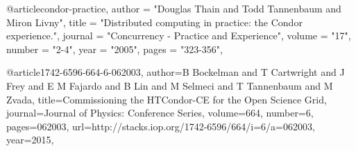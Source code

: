 



@article{condor-practice, 
  author    = "Douglas Thain and Todd Tannenbaum and Miron Livny",
  title     = "Distributed computing in practice: the Condor experience.",
  journal   = "Concurrency - Practice and Experience",
  volume    = "17",
  number    = "2-4",
  year      = "2005",
  pages     = "323-356",
}


@article{1742-6596-664-6-062003,
    author={B Bockelman and T Cartwright and J Frey and E M Fajardo and B Lin and M Selmeci and T Tannenbaum and M Zvada},
    title={Commissioning the HTCondor-CE for the Open Science Grid},
    journal={Journal of Physics: Conference Series},
    volume={664},
    number={6},
    pages={062003},
    url={http://stacks.iop.org/1742-6596/664/i=6/a=062003},
    year={2015},
}
